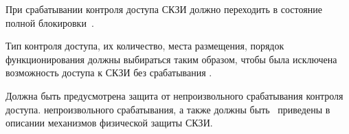 \label{R.PS.Erasing} %
При срабатывании  контроля доступа СКЗИ должно 
переходить в состояние полной блокировки~.
%

\label{R.PS.SensorsQuality} %
Тип  контроля доступа, их количество, места 
размещения, порядок функционирования должны выбираться таким образом, 
чтобы была исключена возможность доступа к  СКЗИ без срабатывания .

\label{R.PS.SensorsFaults} %
Должна быть предусмотрена защита от непроизвольного срабатывания  
контроля доступа.  непроизвольного 
срабатывания, а также  должны 
быть~ приведены в описании механизмов физической защиты СКЗИ. 

